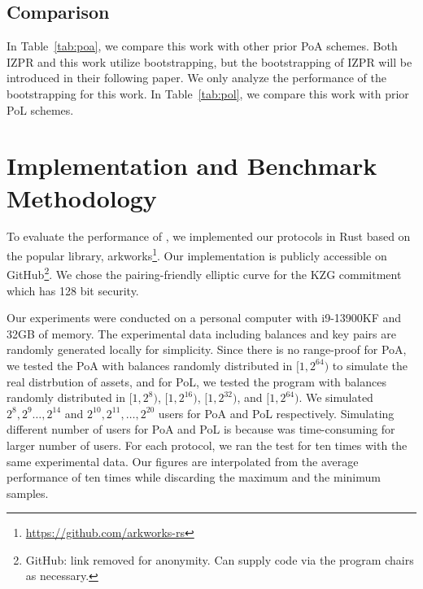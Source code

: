 \subsection{Comparison}



In Table~\ref{tab:poa}, we compare this work with other prior PoA schemes. Both IZPR and this work utilize bootstrapping, but the bootstrapping of IZPR will be introduced in their following paper. We only analyze the performance of the bootstrapping for this work. In Table~\ref{tab:pol}, we compare this work with prior PoL schemes.


\section{Implementation and Benchmark Methodology}



To evaluate the performance of \Sys, we implemented our protocols in Rust based on the popular library, arkworks\footnote{\url{https://github.com/arkworks-rs}}. Our implementation is publicly accessible on GitHub\footnote{GitHub: link removed for anonymity. Can supply code via the program chairs as necessary.}. We chose the pairing-friendly elliptic curve \bls for the KZG commitment which has 128 bit security.

Our experiments were conducted on a personal computer with i9-13900KF and 32GB of memory. The experimental data including balances and \secp key pairs are randomly generated locally for simplicity. Since there is no range-proof for PoA, we tested the PoA with balances randomly distributed in $[1,2^{64})$ to simulate the real distrbution of assets, and for PoL, we tested the program with balances randomly distributed in $[1,2^8)$, $[1,2^{16})$, $[1,2^{32})$, and $[1,2^{64})$. We simulated $2^8,2^9\dots,2^{14}$ and $2^{10},2^{11},\dots,2^{20}$ users for PoA and PoL respectively. Simulating different number of users for PoA and PoL is because \bootstrap was time-consuming for larger number of users. For each protocol, we ran the test for ten times with the same experimental data. Our figures are interpolated from the average performance of ten times while discarding the maximum and the minimum samples.

